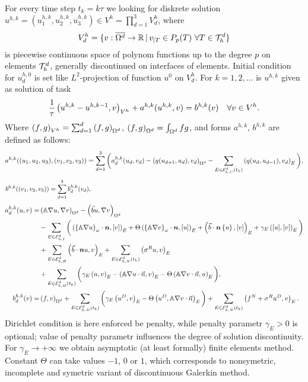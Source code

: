For every time step $t_k=k\tau$ we looking for diskrete solution $u^{h,k}=(u_1^{h,k},u_2^{h,k},u_3^{h,k})\in V^h=\prod_{d=1}^3 V_d^h$,
 where
$$ V_d^h = \{v:\overline{\Omega^d}\to\R\where v_{|T}\in P_p(T)~\forall T\in\Th^d\} $$
is piecewise continuous space of polynom functions up to the degree $p$ on elements $\Th^d$,
 generally discontinued on interfaces of elements.
Initial condition for $u_d^{h,0}$ is set like $L^2$-projection of function $u^0$ on $V_d^h$.
For $k=1,2,\ldots$ is $u^{h,k}$ given as solution of task
\begin{equation*}
 \frac1\tau\sc{u^{h,k}-u^{h,k-1}}{v}_{V^h} + a^{h,k}(u^{h,k},v) = b^{h,k}(v) \quad \forall v\in V^h.
\end{equation*}
Where $\sc{f}{g}_{V^h}=\sum_{d=1}^d\sc{f}{g}_{\Omega^d}$, $\sc{f}{g}_{\Omega^d}=\int_{\Omega^d} f g$,
 and forms $a^{h,k}$, $b^{h,k}$
 are defined as follows:
\[
  a^{h,k}((u_1,u_2,u_3),(v_1,v_2,v_3))
   = \sum_{d=1}^3\bigg( a^{h,k}_d(u_d,v_d)
    - \sc{q(u_{d+1},u_d)}{v_d}_{\Omega^d}
    - \sum_{E\in\Ehcom^d(t_k)}\sc{q(u_d,u_{d-1})}{v_d}_E \bigg),
\]
\[ b^{h,k}((v_1,v_2,v_3)) = \sum_{d=1}^3 b^{h,k}_d(v_d), \mbox{\hspace{11.7cm}} \]
\begin{align*}
 a^{h,k}_d(u,v) = &\sc{\tn A\nabla u}{\nabla v}_{\Omega^d}
 - \sc{\vec b u}{\nabla v}_{\Omega^d}\\
 &- \sum_{E\in\Ehint^d}\bigg(\sc{\wavg{\tn A\nabla u}\cdot\n}{\jmp{v}}_E + \Theta\sc{\wavg{\tn A\nabla v}\cdot\n}{\jmp{u}}_E
 + \sc{\vec b\cdot\n\avg{u}}{\jmp{v}}_E
 + \gamma_E\sc{\jmp{u}}{\jmp{v}}_E\bigg)\\
 &+ \sum_{E\in\Ehb^d}\sc{\vec b\cdot\n u}{v}_E
 + \sum_{E\in\Ehneu^d(t_k)}\sc{\sigma^R u}{v}_E\\
 &+ \sum_{E\in\Ehdir^d(t_k)}\bigg(\gamma_E\sc{u}{v}_E - \sc{\tn A\nabla u\cdot\vec n}{v}_E - \Theta\sc{\tn A\nabla v\cdot\vec n}{u}_E\bigg),\\
% 
 b^{h,k}_d(v) = &\sc{f}{v}_{\Omega^d} + \sum_{E\in\Ehdir^d(t_k)}\bigg(\gamma_E\sc{u^D}{v}_E - \Theta\sc{u^D}{\tn A\nabla v\cdot\vec n}_E\bigg)
 + \sum_{E\in\Ehneu^d(t_k)}\sc{f^N+\sigma^R u^D}{v}_E.
\end{align*}
Dirichlet condition is here enforced be penalty, while penalty parametr $\gamma_E>0$ is optional;
 value of penalty parametr influences the degree of solution discontinuity.
For $\gamma_E\to+\infty$ we obtain asymptotic (at least formally) finite elements method.
Constant $\Theta$ can take values $-1$, $0$ or $1$,
 which corresponds to nonsymetric, incomplete and symetric variant of discontinuous Galerkin method.

